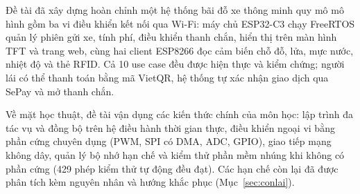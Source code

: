 Đề tài đã xây dựng hoàn chỉnh một hệ thống bãi đỗ xe thông minh quy mô mô hình gồm ba vi
điều khiển kết nối qua Wi-Fi: máy chủ ESP32-C3 chạy FreeRTOS quản lý phiên gửi xe, tính
phí, điều khiển thanh chắn, hiển thị trên màn hình TFT và trang web, cùng hai client
ESP8266 đọc cảm biến chỗ đỗ, lửa, mực nước, nhiệt độ và thẻ RFID. Cả 10 use case đều được
hiện thực và kiểm chứng; người lái có thể thanh toán bằng mã VietQR, hệ thống tự xác nhận
giao dịch qua SePay và mở thanh chắn.

Về mặt học thuật, đề tài vận dụng các kiến thức chính của môn học: lập trình đa tác vụ và
đồng bộ trên hệ điều hành thời gian thực, điều khiển ngoại vi bằng phần cứng chuyên dụng
(PWM, SPI có DMA, ADC, GPIO), giao tiếp mạng không dây, quản lý bộ nhớ hạn chế và kiểm thử
phần mềm nhúng khi không có phần cứng (429 phép kiểm thử tự động đều đạt). Các hạn chế còn
lại đã được phân tích kèm nguyên nhân và hướng khắc phục (Mục~\ref{sec:conlai}).
